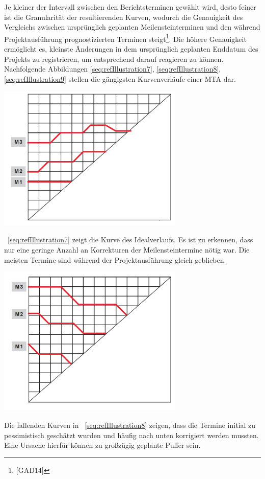 \documentclass[a4paper]{article}
\makeatletter
\newcommand\captionof[1]{\def\@captype{#1}\caption}
\makeatother
\begin{document}
\bigskip

{\sffamily
Je kleiner der Intervall zwischen den Berichtsterminen gewählt wird, desto feiner ist die Granularität der
resultierenden Kurven, wodurch die Genauigkeit des Vergleichs zwischen ursprünglich geplanten Meilensteinterminen und
den während Projektausführung prognostizierten Terminen steigt\footnote{[GAD14]}. Die höhere Genauigkeit ermöglicht es,
kleinste Änderungen in dem ursprünglich geplanten Enddatum des Projekts zu registrieren, um entsprechend darauf
reagieren zu können. Nachfolgende Abbildungen \ref{seq:refIllustration7}, \ref{seq:refIllustration8},
\ref{seq:refIllustration9} stellen die gängigsten Kurvenverläufe einer MTA dar.}


\bigskip

{\centering \includegraphics[width=8.881cm,height=6.944cm]{INMAusarbeitung02-img/INMAusarbeitung02-img008.png}
\captionof{figure}[Idealverlauf der MTA{}-Kurven]{Idealverlauf der MTA-Kurven}
\label{seq:refIllustration7}
\par}
{\sffamily
\figurename~\ref{seq:refIllustration7} zeigt die Kurve des Idealverlaufs. Es ist zu erkennen, dass nur eine geringe
Anzahl an Korrekturen der Meilensteintermine nötig war. Die meisten Termine sind während der Projektausführung gleich
geblieben.}

{\centering \includegraphics[width=8.902cm,height=7.177cm]{INMAusarbeitung02-img/INMAusarbeitung02-img009.png}
\captionof{figure}[Kurvenverlauf der Pessimistenschätzung]{Kurvenverlauf der Pessimistenschätzung}
\label{seq:refIllustration8}
\par}
{\sffamily
Die fallenden Kurven in \figurename~\ref{seq:refIllustration8} zeigen, dass die Termine initial zu pessimistisch
geschätzt wurden und häufig nach unten korrigiert werden mussten. Eine Ursache hierfür können zu großzügig geplante
Puffer sein.}
\end{document}
